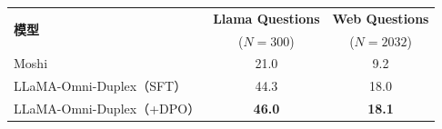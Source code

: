 \begin{table}[!htbp]
    \label{tab:fullduplex_qa}
    \centering
    \small
    \begin{tabular}{lcc}
        \toprule
        \multirow{2}{*}{\textbf{模型}} & \textbf{Llama Questions} & \textbf{Web Questions} \\
        & ($N=300$) & ($N=2032$) \\
        \midrule
        Moshi & 21.0 & 9.2 \\
        LLaMA-Omni-Duplex（SFT） & 44.3 & 18.0 \\
        LLaMA-Omni-Duplex（+DPO） & \textbf{46.0} & \textbf{18.1} \\
        \bottomrule
    \end{tabular}
\end{table}
